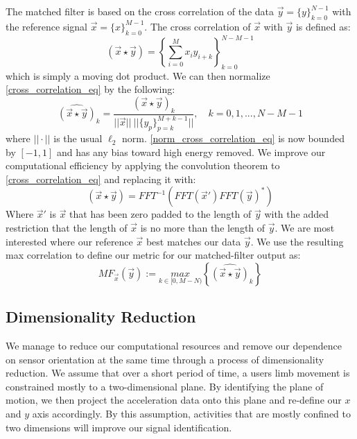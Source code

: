 \documentclass[journal]{IEEEtran}
\begin{document}
The matched filter is based on the cross correlation of the data $\vec{y} = \{y\}_{k=0}^{N-1}$ with the reference signal $\vec{x} = \{x\}_{k=0}^{M-1}$.
The cross correlation of $\vec{x}$ with $\vec{y}$ is defined as:
%
\begin{equation} \label{cross_correlation_eq}
(\vec{x} \star \vec{y}) = \left \{\sum_{i=0}^{M}x_{i} y_{i+k} \right \}_{k=0}^{N-M-1}
\end{equation}
%
which is simply a moving dot product.
We can then normalize \eqref{cross_correlation_eq} by the following:
%
\begin{equation} \label{norm_cross_correlation_eq}
\widehat{(\vec{x} \star \vec{y})}_k = \frac{(\vec{x} \star \vec{y})_k}{||\vec{x}|| \ || \{y_p\}_{p=k}^{M+k-1} || }, \quad k = 0,1,...,N-M-1
\end{equation}
%
where $|| \cdot ||$ is the usual $\ell_2$ norm. \eqref{norm_cross_correlation_eq} is now bounded by $[-1,1]$ and has any bias toward high energy removed.
We improve our computational efficiency by applying the convolution theorem to \eqref{cross_correlation_eq} and replacing it with:
%
\begin{equation} \label{conv_theorem}
(\vec{x} \star \vec{y}) = FFT^{-1}(FFT(\vec{x}') FFT(\vec{y})^*)
\end{equation}
%
Where $\vec{x}'$ is $\vec{x}$ that has been zero padded to the length of $\vec{y}$ with the added restriction that the length of $\vec{x}$ is no more than the length of $\vec{y}$.
We are most interested where our reference $\vec{x}$ best matches our data $\vec{y}$.
We use the resulting max correlation to define our metric for  our matched-filter output as:
%
\begin{equation} \label{matched_filter_eq}
MF_{\vec{x}}(\vec{y}) := \underset{k \in [0, M-N)}{max} \left \{\widehat{(\vec{x} \star \vec{y})}_k \right \}
\end{equation}
%
\subsection{Dimensionality Reduction}
We manage to reduce our computational resources and remove our dependence on sensor orientation at the same time through a process of dimensionality reduction.
We assume that over a short period of time, a user\textquotesingle s limb movement is constrained mostly to a two-dimensional plane.
By identifying the plane of motion, we then project the acceleration data onto this plane and re-define our $x$ and $y$ axis accordingly.
By this assumption, activities that are mostly confined to two dimensions will improve our signal identification.
\end{document}
